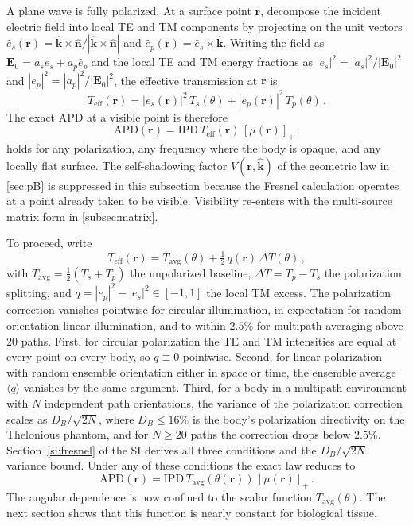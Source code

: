 \documentclass[journal,twocolumn,10pt]{IEEEtran}
\theoremstyle{plain}
\newcommand{\khat}{\hat{\bm{k}}}
\newcommand{\nhat}{\hat{\bm{n}}}
\newcommand{\rr}{\mathbf{r}}
\newcommand{\EE}{\mathbf{E}}
\newcommand{\IPD}{\mathrm{IPD}}
\newcommand{\APD}{\mathrm{APD}}
\newcommand{\Teff}{T_{\mathrm{eff}}}
\newcommand{\Tavg}{T_{\mathrm{avg}}}
\newcommand{\pospart}[1]{\left[#1\right]_{+}}
\newcommand{\Vis}{V}
\begin{document}
A plane wave is fully polarized. At a surface point
$\rr$, decompose the incident electric field into local TE and TM
components by projecting on the unit vectors
$\hat{e}_s(\rr) = \khat \times \nhat / |\khat \times \nhat|$ and
$\hat{e}_p(\rr) = \hat{e}_s \times \khat$. Writing the field as
$\EE_0 = a_s \hat{e}_s + a_p \hat{e}_p$ and the local TE and TM
energy fractions as $|e_s|^2 = |a_s|^2 / |\EE_0|^2$ and
$|e_p|^2 = |a_p|^2 / |\EE_0|^2$, the effective transmission at $\rr$
is
\begin{equation}\label{eq:Teff}
  \Teff(\rr) = |e_s(\rr)|^2 \, T_s(\theta) + |e_p(\rr)|^2 \,
  T_p(\theta)\, .
\end{equation}
The exact \gls{APD} at a visible point is therefore
\begin{equation}\label{eq:Sab-exact}
  \APD(\rr) = \IPD \, \Teff(\rr) \, \pospart{\mu(\rr)} \,.
\end{equation}
 holds for any polarization, any frequency where
the body is opaque, and any locally flat surface. The self-shadowing
factor $\Vis(\rr,\khat)$ of the geometric law in \cref{sec:pB} is
suppressed in this subsection because the Fresnel calculation
operates at a point already taken to be visible. Visibility re-enters
with the multi-source matrix form in \cref{subsec:matrix}.

To proceed, write
\begin{equation}\label{eq:Teff-decomp}
  \Teff(\rr) = \Tavg(\theta) + \tfrac{1}{2}\,q(\rr)\,\Delta T(\theta)\, ,
\end{equation}
with $\Tavg = \tfrac{1}{2}(T_s + T_p)$ the unpolarized baseline,
$\Delta T = T_p - T_s$ the polarization splitting, and $q = |e_p|^2 -
|e_s|^2 \in [-1, 1]$ the local TM excess. The polarization correction
vanishes pointwise for circular illumination, in expectation for
random-orientation linear illumination, and to within $2.5\%$ for
multipath averaging above 20 paths. First, for circular polarization
the TE and TM intensities are equal at every point on every body, so
$q \equiv 0$ pointwise. Second, for linear polarization with random
ensemble orientation either in space or time, the ensemble average
$\langle q\rangle$ vanishes by the same argument. Third, for a body
in a multipath environment with $N$ independent path orientations,
the variance of the polarization correction scales as $D_B/\sqrt{2N}$,
where $D_B \le 16\%$ is the body's polarization directivity on the
Thelonious phantom, and for $N \ge 20$ paths the correction drops
below $2.5\%$. Section~\ref{si:fresnel} of the SI derives all three
conditions and the $D_B/\sqrt{2N}$ variance bound. Under any of these conditions the exact law reduces to
\begin{equation}\label{eq:Sab-Tavg}
  \APD(\rr) = \IPD \, \Tavg(\theta(\rr)) \, \pospart{\mu(\rr)}\, .
\end{equation}
The angular dependence is now confined to the scalar function
$\Tavg(\theta)$. The next section shows that this function is nearly
constant for biological tissue.
\end{document}
